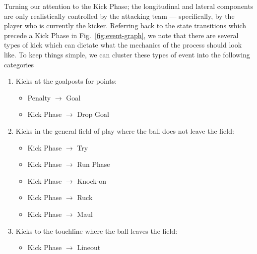 Turning our attention to the {\sf Kick Phase}; the longitudinal and lateral components are only realistically controlled by the attacking team --- specifically, by the player who is currently the kicker. Referring back to the state transitions which precede a {\sf Kick Phase} in Fig.~\ref{fig:event-graph}, we note that there are several types of kick which can dictate what the mechanics of the process should look like. To keep things simple, we can cluster these types of event into the following categories
\begin{enumerate}
\item Kicks at the goalposts for points:
\begin{itemize}
    \item {\sf Penalty} $\longrightarrow$ {\sf Goal}
    \item {\sf Kick Phase} $\longrightarrow$ {\sf Drop Goal}
\end{itemize}
\item Kicks in the general field of play where the ball does not leave the field:
\begin{itemize}
    \item {\sf Kick Phase} $\longrightarrow$ {\sf Try}
    \item {\sf Kick Phase} $\longrightarrow$ {\sf Run Phase}
    \item {\sf Kick Phase} $\longrightarrow$ {\sf Knock-on}
    \item {\sf Kick Phase} $\longrightarrow$ {\sf Ruck}
    \item {\sf Kick Phase} $\longrightarrow$ {\sf Maul}
\end{itemize} 
\item Kicks to the touchline where the ball leaves the field:
\begin{itemize}
    \item {\sf Kick Phase} $\longrightarrow$ {\sf Lineout}
\end{itemize}  
\end{enumerate}

